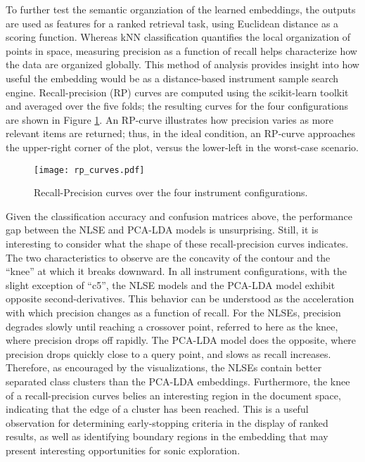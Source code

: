 To further test the semantic organziation of the learned embeddings, the outputs are used as features for a ranked retrieval task, using Euclidean distance as a scoring function.
Whereas kNN classification quantifies the local organization of points in space, measuring precision as a function of recall helps characterize how the data are organized globally.
This method of analysis provides insight into how useful the embedding would be as a distance-based instrument sample search engine.
Recall-precision (RP) curves are computed using the scikit-learn toolkit and averaged over the five folds; the resulting curves for the four configurations are shown in Figure \ref{fig:rp_curves}.
An RP-curve illustrates how precision varies as more relevant items are returned; thus, in the ideal condition, an RP-curve approaches the upper-right corner of the plot, versus the lower-left in the worst-case scenario.

\begin{figure}[h]
\centering
\texttt{[image: rp\_curves.pdf]}
\caption{Recall-Precision curves over the four instrument configurations.}
\label{fig:rp_curves}
\end{figure}

Given the classification accuracy and confusion matrices above, the performance gap between the NLSE and PCA-LDA models is unsurprising.
Still, it is interesting to consider what the shape of these recall-precision curves indicates.
The two characteristics to observe are the concavity of the contour and the ``knee'' at which it breaks downward.
In all instrument configurations, with the slight exception of ``c5'', the NLSE models and the PCA-LDA model exhibit opposite second-derivatives.
This behavior can be understood as the acceleration with which precision changes as a function of recall.
For the NLSEs, precision degrades slowly until reaching a crossover point, referred to here as the knee, where precision drops off rapidly.
The PCA-LDA model does the opposite, where precision drops quickly close to a query point, and slows as recall increases.
Therefore, as encouraged by the visualizations, the NLSEs contain better separated class clusters than the PCA-LDA embeddings.
Furthermore, the knee of a recall-precision curves belies an interesting region in the document space, indicating that the edge of a cluster has been reached.
This is a useful observation for determining early-stopping criteria in the display of ranked results, as well as identifying boundary regions in the embedding that may present interesting opportunities for sonic exploration.

